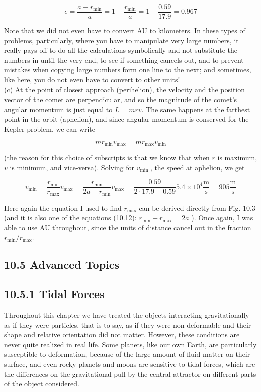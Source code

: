 \documentclass[10pt]{article}
\begin{document}
\begin{equation*}
e=\frac{a-r_{\min }}{a}=1-\frac{r_{\min }}{a}=1-\frac{0.59}{17.9}=0.967 \tag{10.23}
\end{equation*}


Note that we did not even have to convert AU to kilometers. In these types of problems, particularly, where you have to manipulate very large numbers, it really pays off to do all the calculations symbolically and not substitute the numbers in until the very end, to see if something cancels out, and to prevent mistakes when copying large numbers form one line to the next; and sometimes, like here, you do not even have to convert to other units!\\
(c) At the point of closest approach (perihelion), the velocity and the position vector of the comet are perpendicular, and so the magnitude of the comet's angular momentum is just equal to $L=m r v$. The same happens at the farthest point in the orbit (aphelion), and since angular momentum is conserved for the Kepler problem, we can write


\begin{equation*}
m r_{\min } v_{\max }=m r_{\max } v_{\min } \tag{10.24}
\end{equation*}


(the reason for this choice of subscripts is that we know that when $r$ is maximum, $v$ is minimum, and vice-versa). Solving for $v_{\text {min }}$, the speed at aphelion, we get


\begin{equation*}
v_{\min }=\frac{r_{\min }}{r_{\max }} v_{\max }=\frac{r_{\min }}{2 a-r_{\min }} v_{\max }=\frac{0.59}{2 \cdot 17.9-0.59} 5.4 \times 10^{4} \frac{\mathrm{m}}{\mathrm{s}}=905 \frac{\mathrm{m}}{\mathrm{s}} \tag{10.25}
\end{equation*}


Here again the equation I used to find $r_{\max }$ can be derived directly from Fig. 10.3 (and it is also one of the equations (10.12): $r_{\min }+r_{\max }=2 a$ ). Once again, I was able to use AU throughout, since the units of distance cancel out in the fraction $r_{\min } / r_{\max }$.

\subsection*{10.5 Advanced Topics}
\subsection*{10.5.1 Tidal Forces}
Throughout this chapter we have treated the objects interacting gravitationally as if they were particles, that is to say, as if they were non-deformable and their shape and relative orientation did not matter. However, these conditions are never quite realized in real life. Some planets, like our own Earth, are particularly susceptible to deformation, because of the large amount of fluid matter on their surface, and even rocky planets and moons are sensitive to tidal forces, which are the differences on the gravitational pull by the central attractor on different parts of the object considered.
\end{document}
